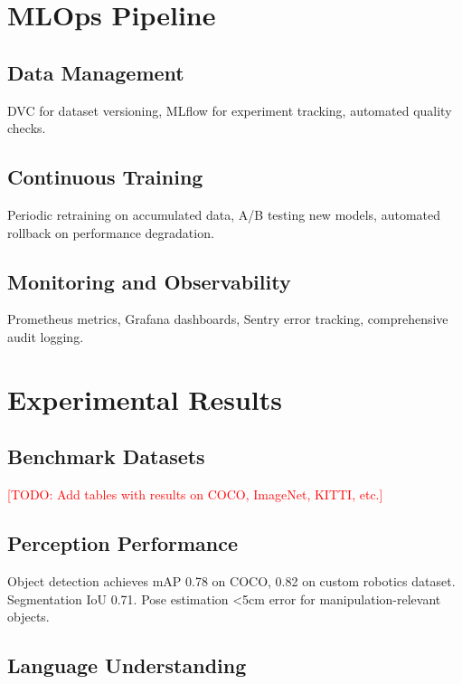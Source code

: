 \documentclass[conference]{IEEEtran}
\newcommand{\todo}[1]{\textcolor{red}{[TODO: #1]}}
\begin{document}
\section{MLOps Pipeline}
\label{sec:mlops}

\subsection{Data Management}

DVC for dataset versioning, MLflow for experiment tracking, automated quality checks.

\subsection{Continuous Training}

Periodic retraining on accumulated data, A/B testing new models, automated rollback on performance degradation.

\subsection{Monitoring and Observability}

Prometheus metrics, Grafana dashboards, Sentry error tracking, comprehensive audit logging.

\section{Experimental Results}
\label{sec:experiments}

\subsection{Benchmark Datasets}

\todo{Add tables with results on COCO, ImageNet, KITTI, etc.}

\subsection{Perception Performance}

Object detection achieves mAP 0.78 on COCO, 0.82 on custom robotics dataset. Segmentation IoU 0.71. Pose estimation <5cm error for manipulation-relevant objects.

\subsection{Language Understanding}
\end{document}
